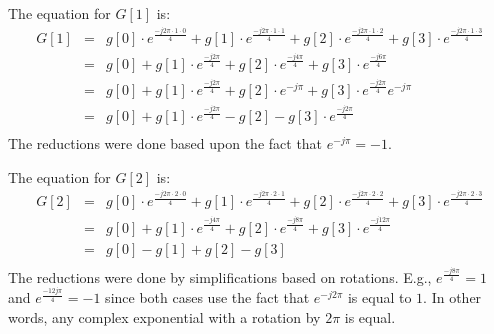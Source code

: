 The equation for $G[1]$ is:
\begin{equation}
\begin{array} {lll} 
G[1] & = & g[0] \cdot e^{\frac{-j 2 \pi \cdot 1 \cdot 0}{4}} + g[1] \cdot e^{\frac{-j 2 \pi \cdot 1 \cdot 1}{4}} + g[2] \cdot e^{\frac{-j 2 \pi \cdot 1 \cdot 2}{4}} + g[3] \cdot e^{\frac{-j 2 \pi \cdot 1 \cdot 3}{4}}\\
 & = & g[0] + g[1] \cdot e^{\frac{-j 2 \pi}{4}} + g[2] \cdot e^{\frac{-j 4 \pi}{4}} + g[3] \cdot e^{\frac{-j 6 \pi}{4}}\\
 & = & g[0] + g[1] \cdot e^{\frac{-j 2 \pi}{4}} + g[2] \cdot e^{-j \pi}   + g[3] \cdot e^{\frac{-j 2 \pi}{4}} e^{-j \pi} \\
 & = & g[0] + g[1] \cdot e^{\frac{-j 2 \pi}{4}} - g[2] - g[3] \cdot e^{\frac{-j 2 \pi}{4}}\\
\end{array} 
\end{equation} The reductions were done based upon the fact that $e^{-j \pi} = -1$. 

The equation for $G[2]$ is:
\begin{equation}
\begin{array} {lll} 
G[2] & = & g[0] \cdot e^{\frac{-j 2 \pi \cdot 2 \cdot 0}{4}} + g[1] \cdot e^{\frac{-j 2 \pi \cdot 2 \cdot 1}{4}} + g[2] \cdot e^{\frac{-j 2 \pi \cdot 2 \cdot 2}{4}} + g[3] \cdot e^{\frac{-j 2 \pi \cdot 2 \cdot 3}{4}}\\
 & = & g[0] + g[1] \cdot e^{\frac{-j 4 \pi}{4}} + g[2] \cdot e^{\frac{-j 8 \pi}{4}} + g[3] \cdot e^{\frac{-j 12 \pi}{4}}\\
 & = & g[0] - g[1]  + g[2] -  g[3] \\
\end{array} 
\end{equation} The reductions were done by simplifications based on rotations. E.g., $e^{\frac{-j 8 \pi}{4}} = 1$ and $e^{\frac{-12 j \pi}{4}} = -1$ since both cases use the fact that $e^{-j 2\pi}$ is equal to $1$. In other words, any complex exponential with a rotation by $2 \pi$ is equal.

